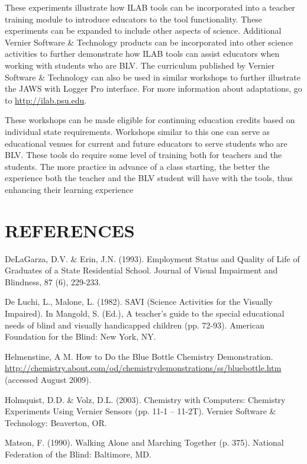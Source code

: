 \documentclass[11.5pt]{sig-alternate} %
\begin{document}
\begin{large}
These experiments illustrate how ILAB tools can be incorporated into a teacher training module to introduce educators to the tool functionality. These experiments can be expanded to include other aspects of science. Additional Vernier Software \& Technology products can be incorporated into other science activities to further demonstrate how ILAB tools can assist educators when working with students who are BLV. The curriculum published by Vernier Software \& Technology can also be used in similar workshops to further illustrate the JAWS with Logger Pro interface. For more information about adaptations, go to \url{http://ilab.psu.edu}.

These workshops can be made eligible for continuing education credits based on individual state requirements. Workshops similar to this one can serve as educational venues for current and future educators to serve students who are BLV. These tools do require some level of training both for teachers and the students. The more practice in advance of a class starting, the better the experience both the teacher and the BLV student will have with the tools, thus enhancing their learning experience

\end{large}
\clearpage
\section*{REFERENCES}\par 

\leftskip 0.25in
\parindent -0.25in 

DeLaGarza, D.V. \& Erin, J.N. (1993). Employment Status and Quality of Life of Graduates of a State Residential School. Journal of Visual Impairment and Blindness, 87 (6), 229-233.

De Luchi, L., Malone, L. (1982). SAVI (Science Activities for the Visually Impaired). In Mangold, S. (Ed.), A teacher’s guide to the special educational needs of blind and visually handicapped children (pp. 72-93). American Foundation for the Blind: New York, NY. 

Helmenstine, A M. How to Do the Blue Bottle Chemistry Demonstration. \url{http://chemistry.about.com/od/chemistrydemonstrations/ss/bluebottle.htm} (accessed August 2009).

Holmquist, D.D. \& Volz, D.L. (2003). Chemistry with Computers: Chemistry Experiments Using Vernier Sensors (pp. 11-1 – 11-2T). Vernier Software \& Technology: Beaverton, OR. 

Matson, F. (1990). Walking Alone and Marching Together (p. 375). National Federation of the Blind: Baltimore, MD.
\end{document}
